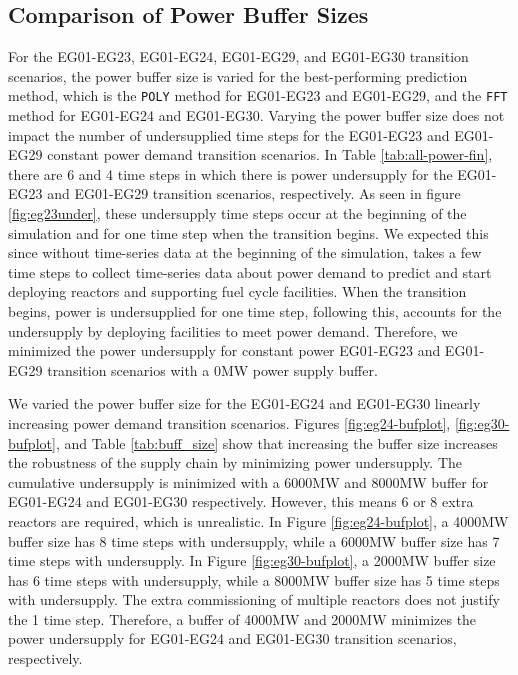 \subsection{Comparison of Power Buffer Sizes}
For the EG01-EG23, EG01-EG24, EG01-EG29, and EG01-EG30 transition scenarios, 
the power buffer size is varied for the best-performing prediction method, 
which is the \texttt{POLY} method for EG01-EG23 and EG01-EG29, and the 
\texttt{FFT} method for EG01-EG24 and EG01-EG30. 
Varying the power buffer size does not impact the number of 
undersupplied time steps for the EG01-EG23 and EG01-EG29 constant 
power demand transition scenarios.
In Table \ref{tab:all-power-fin}, there are 6 and 4 time steps
in which there is power undersupply for the EG01-EG23 and EG01-EG29 
transition scenarios, respectively. 
As seen in figure \ref{fig:eg23under}, these undersupply time 
steps occur at the beginning of the simulation and for one 
time step when the transition begins. 
We expected this since without time-series data 
at the beginning of the simulation, \deploy takes a few 
time steps to collect time-series data about power demand 
to predict and start deploying reactors and supporting 
fuel cycle facilities. 
When the transition begins, power is undersupplied for one 
time step, following this, \deploy accounts for the 
undersupply by deploying facilities to meet power demand.
Therefore, we minimized the power undersupply for constant 
power EG01-EG23 and EG01-EG29 transition scenarios with 
a 0MW power supply buffer. 

We varied the power buffer size for the EG01-EG24 and EG01-EG30 
linearly increasing power demand transition scenarios. 
Figures \ref{fig:eg24-bufplot}, \ref{fig:eg30-bufplot}, 
and Table \ref{tab:buff_size} 
show that increasing the buffer size increases the robustness 
of the supply chain by minimizing power undersupply. 
The cumulative undersupply is minimized with a 6000MW and 8000MW 
buffer for EG01-EG24 and EG01-EG30 respectively.
However, this means 6 or 8 extra reactors are required, which 
is unrealistic.
In Figure \ref{fig:eg24-bufplot}, a 4000MW buffer size has 
8 time steps with undersupply, while a 6000MW buffer size has 
7 time steps with undersupply. 
In Figure \ref{fig:eg30-bufplot}, a 2000MW buffer size has 
6 time steps with undersupply, while a 8000MW buffer size has 
5 time steps with undersupply. 
The extra commissioning of multiple reactors does not justify the 1 time 
step. 
Therefore, a buffer of 4000MW and 2000MW minimizes 
the power undersupply for EG01-EG24 and EG01-EG30 transition 
scenarios, respectively.

